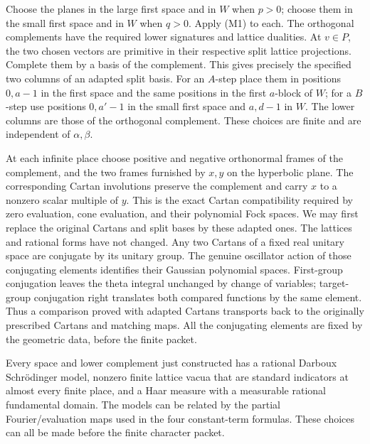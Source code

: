 Choose the planes in the large first space and in \(W\) when
\(p>0\); choose them in the small first space and in \(W\)
when \(q>0\). Apply (M1) to each. The orthogonal complements
have the required lower signatures and lattice dualities.
At \(v\in P\), the two chosen vectors are primitive in their
respective split lattice projections. Complete them by a
basis of the complement. This gives precisely the specified
two columns of an adapted split basis. For an \(A\)-step place
them in positions \(0,a-1\) in the first space and the same
positions in the first \(a\)-block of \(W\); for a \(B\)-step
use positions \(0,a'-1\) in the small first space and
\(a,d-1\) in \(W\). The lower columns are those of the
orthogonal complement. These choices are finite and are
independent of \(\alpha,\beta\).

At each infinite place choose positive and negative orthonormal
frames of the complement, and the two frames furnished by
\(x,y\) on the hyperbolic plane. The corresponding Cartan
involutions preserve the complement and carry \(x\) to a
nonzero scalar multiple of \(y\). This is the exact Cartan
compatibility required by zero evaluation, cone evaluation,
and their polynomial Fock spaces. We may first replace the
original Cartans and split bases by these adapted ones.
The lattices and rational forms have not changed.
Any two Cartans of a fixed real unitary space are conjugate
by its unitary group. The genuine oscillator action of those
conjugating elements identifies their Gaussian polynomial
spaces. First-group conjugation leaves the theta integral
unchanged by change of variables; target-group conjugation
right translates both compared functions by the same element.
Thus a comparison proved with adapted Cartans transports
back to the originally prescribed Cartans and matching maps.
All the conjugating elements are fixed by the geometric data,
before the finite packet.

\begin{srlemma}
\label{lem:sr-theta-fixed-models}
Every space and lower complement just constructed has a rational
Darboux Schr\"odinger model, nonzero finite lattice vacua that
are standard indicators at almost every finite place, and a
Haar measure with a measurable rational fundamental domain.
The models can be related by the partial Fourier/evaluation
maps used in the four constant-term formulas.
These choices can all be made before the finite character packet.
\end{srlemma}

